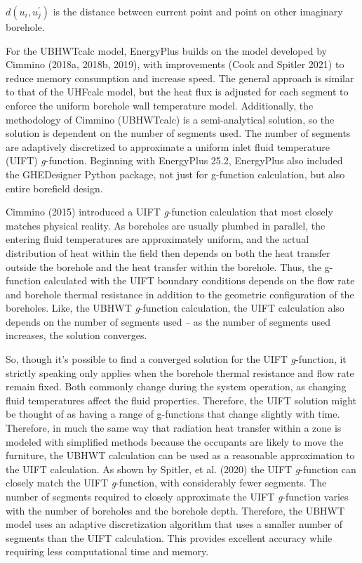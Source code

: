 \(d(u_i, u_j^{'})\) is the distance between current point and point on other imaginary borehole.

For the UBHWTcalc model, EnergyPlus builds on the model developed by Cimmino (2018a, 2018b, 2019), with improvements (Cook and Spitler 2021) to reduce memory consumption and increase speed. The general approach is similar to that of the UHFcalc model, but the heat flux is adjusted for each segment to enforce the uniform borehole wall temperature model. Additionally, the methodology of Cimmino (UBHWTcalc) is a semi-analytical solution, so the solution is dependent on the number of segments used. The number of segments are adaptively discretized to approximate a uniform inlet fluid temperature (UIFT) \emph{g}-function.  Beginning with EnergyPlus 25.2, EnergyPlus also included the GHEDesigner Python package, not just for g-function calculation, but also entire borefield design.

Cimmino (2015) introduced a UIFT \emph{g}-function calculation that most closely matches physical reality. As boreholes are usually plumbed in parallel, the entering fluid temperatures are approximately uniform, and the actual distribution of heat within the field then depends on both the heat transfer outside the borehole and the heat transfer within the borehole. Thus, the g-function calculated with the UIFT boundary conditions depends on the flow rate and borehole thermal resistance in addition to the geometric configuration of the boreholes. Like, the UBHWT \emph{g}-function calculation, the UIFT calculation also depends on the number of segments used – as the number of segments used increases, the solution converges.

So, though it’s possible to find a converged solution for the UIFT \emph{g}-function, it strictly speaking only applies when the borehole thermal resistance and flow rate remain fixed. Both commonly change during the system operation, as changing fluid temperatures affect the fluid properties. Therefore, the UIFT solution might be thought of as having a range of g-functions that change slightly with time. Therefore, in much the same way that radiation heat transfer within a zone is modeled with simplified methods because the occupants are likely to move the furniture, the UBHWT calculation can be used as a reasonable approximation to the UIFT calculation. As shown by Spitler, et al. (2020) the UIFT \emph{g}-function can closely match the UIFT \emph{g}-function, with considerably fewer segments. The number of segments required to closely approximate the UIFT \emph{g}-function varies with the number of boreholes and the borehole depth. Therefore, the UBHWT model uses an adaptive discretization algorithm that uses a smaller number of segments than the UIFT calculation. This provides excellent accuracy while requiring less computational time and memory.

